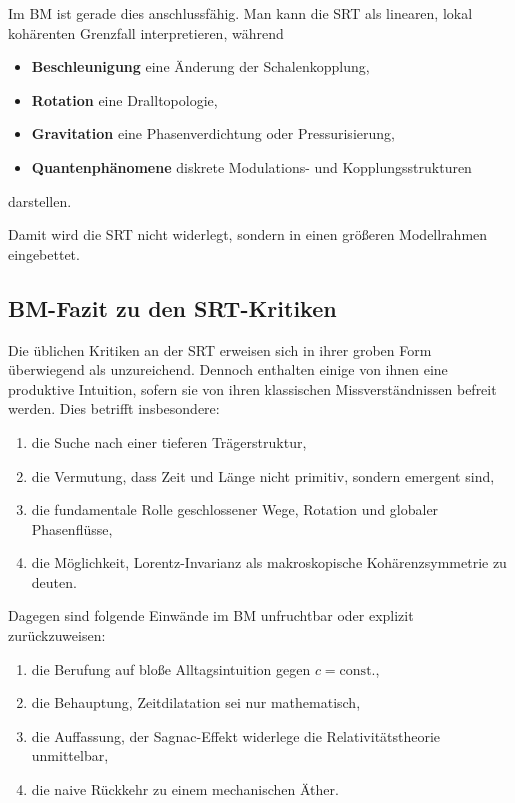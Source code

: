 \documentclass[12pt,a4paper]{article}
\begin{document}
	Im BM ist gerade dies anschlussfähig. Man kann die SRT als linearen, lokal kohärenten Grenzfall interpretieren, während
	\begin{itemize}
		\item \textbf{Beschleunigung} eine Änderung der Schalenkopplung,
		\item \textbf{Rotation} eine Dralltopologie,
		\item \textbf{Gravitation} eine Phasenverdichtung oder Pressurisierung,
		\item \textbf{Quantenphänomene} diskrete Modulations- und Kopplungsstrukturen
	\end{itemize}
	darstellen.
	
	Damit wird die SRT nicht widerlegt, sondern in einen größeren Modellrahmen eingebettet.
	
	\subsection{BM-Fazit zu den SRT-Kritiken}
	
	Die üblichen Kritiken an der SRT erweisen sich in ihrer groben Form überwiegend als unzureichend. Dennoch enthalten einige von ihnen eine produktive Intuition, sofern sie von ihren klassischen Missverständnissen befreit werden. Dies betrifft insbesondere:
	
	\begin{enumerate}
		\item die Suche nach einer tieferen Trägerstruktur,
		\item die Vermutung, dass Zeit und Länge nicht primitiv, sondern emergent sind,
		\item die fundamentale Rolle geschlossener Wege, Rotation und globaler Phasenflüsse,
		\item die Möglichkeit, Lorentz-Invarianz als makroskopische Kohärenzsymmetrie zu deuten.
	\end{enumerate}
	
	Dagegen sind folgende Einwände im BM unfruchtbar oder explizit zurückzuweisen:
	\begin{enumerate}
		\item die Berufung auf bloße Alltagsintuition gegen \(c=\mathrm{const.}\),
		\item die Behauptung, Zeitdilatation sei nur mathematisch,
		\item die Auffassung, der Sagnac-Effekt widerlege die Relativitätstheorie unmittelbar,
		\item die naive Rückkehr zu einem mechanischen Äther.
	\end{enumerate}
	
\end{document}
